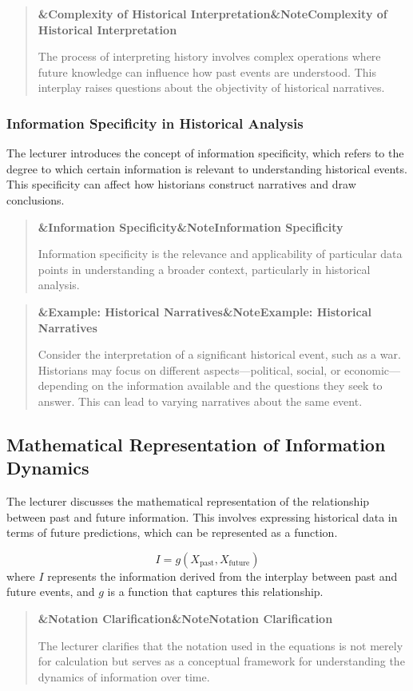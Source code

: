 \documentclass[a4paper]{article}
\newcommand{\boxheading}[1]{%
  \par\smallskip
  \noindent\textbf{\ifx&#1&Note\else#1\fi}\par
  \smallskip
}
\newenvironment{defbox}[1][]{%
  \begin{quote}\color{green!40!black}\boxheading{#1}\normalcolor
}{\end{quote}}
\newenvironment{exbox}[1][]{%
  \begin{quote}\color{brown!70!black}\boxheading{#1}\normalcolor
}{\end{quote}}
\newenvironment{rembox}[1][]{%
  \begin{quote}\color{black!70}\boxheading{#1}\normalcolor
}{\end{quote}}
\begin{document}
\begin{rembox}[Complexity of Historical Interpretation]
The process of interpreting history involves complex operations where future knowledge can influence how past events are understood. This interplay raises questions about the objectivity of historical narratives.
\end{rembox}

\subsubsection{Information Specificity in Historical Analysis}
The lecturer introduces the concept of information specificity, which refers to the degree to which certain information is relevant to understanding historical events. This specificity can affect how historians construct narratives and draw conclusions.

\begin{defbox}[Information Specificity]
Information specificity is the relevance and applicability of particular data points in understanding a broader context, particularly in historical analysis.
\end{defbox}

\begin{exbox}[Example: Historical Narratives]
Consider the interpretation of a significant historical event, such as a war. Historians may focus on different aspects---political, social, or economic---depending on the information available and the questions they seek to answer. This can lead to varying narratives about the same event.
\end{exbox}

\subsection{Mathematical Representation of Information Dynamics}
The lecturer discusses the mathematical representation of the relationship between past and future information. This involves expressing historical data in terms of future predictions, which can be represented as a function.

\begin{equation}
I = g(X_{\text{past}}, X_{\text{future}})
\end{equation}
where \( I \) represents the information derived from the interplay between past and future events, and \( g \) is a function that captures this relationship.

\begin{rembox}[Notation Clarification]
The lecturer clarifies that the notation used in the equations is not merely for calculation but serves as a conceptual framework for understanding the dynamics of information over time.
\end{rembox}
\end{document}
